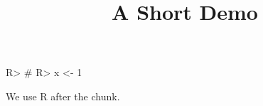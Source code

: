 \documentclass[article]{jss}
\title{A Short Demo}
\begin{document}
\begin{Sinput}
R> # %
R> x <- 1
\end{Sinput}
We use R after the chunk.
\end{document}
